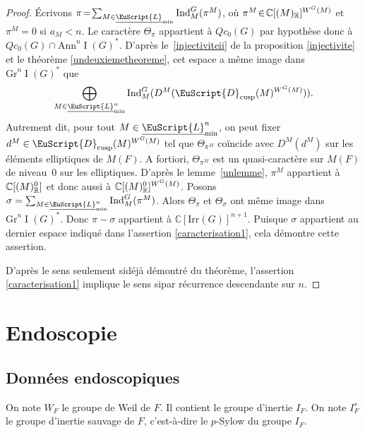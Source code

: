 \documentclass[JEP,XML,SOM,Unicode,francais]{cedram}
\let\mathcal \EuScript
\newcommand{\NoChangel}[1]{%
\expandafter\let\csname old\string#1\endcsname=#1
\let#1=\relax
\newcommand{#1}{\mathcode`l="716C\csname old\string#1\endcsname\mathcode`l="7160 }%
}
\newcommand{\Ann}{\mathrm{Ann}}
\newcommand{\cusp}{\mathrm{cusp}}
\newcommand{\Ell}{\mathrm{Ell}} \NoChangel{\Ell}
\newcommand{\Gr}{\mathrm{Gr}}
\newcommand{\Ind}{\mathrm{Ind}}
\newcommand{\Irr}{\mathrm{Irr}}
\DeclareMathOperator{\rI}{I}
\newcommand{\cD}{\mathcal{D}}
\newcommand{\cL}{\mathcal{L}}
\newcommand{\CC}{\mathbb{C}}
\newcommand{\RR}{\mathbb{R}}
\theoremstyle{plain}
\theoremstyle{definition}
\begin{document}
\begin{proof}
Écrivons $\pi\!=\!\sum_{M\in \underline{\cL}_{\min}}\Ind_{M}^G(\pi^M)$, où $\pi^M\!\in\!\CC[\Ell(M)_{\RR}]^{W^G(M)}$ et $\pi^M\!=\!0$ si $a_{M}\!<\!n$. Le caractère $\Theta_{\pi}$ appartient à $Qc_{0}(G)$ par hypothèse donc à $Qc_{0}(G)\cap \Ann^n\rI(G)^*$. D'après le~\eqref{injectiviteii} de la proposition \ref{injectivite} et le théorème \ref{undeuxiemetheoreme}, cet espace a même image dans $\Gr^n\rI(G)^*$ que
\[
\bigoplus_{M\in \underline{\cL}^n_{\min}}\Ind_{M}^G(D^M(\cD_{\cusp}(M)^{W^G(M)})).
\]
Autrement dit, pour tout $M\in \underline{\cL}^n_{\min}$, on peut fixer $d^M\in \cD_{\cusp}(M)^{W^G(M)}$ tel que $\Theta_{\pi^M}$ coïncide avec $D^M(d^M)$ sur les éléments elliptiques de $M(F)$. A fortiori, $\Theta_{\pi^M}$ est un quasi-caractère sur $M(F)$ de niveau~$0$ sur les elliptiques. D'après le lemme~\ref{unlemme}, $\pi^M$ appartient à $\CC[\Ell(M)_{\RR}^0]$ et donc aussi à $\CC[\Ell(M)_{\RR}^0]^{W^G(M)}$. Posons
$\sigma=\sum_{M\in \underline{\cL}^n_{\min}}\Ind_{M}^G(\pi^M)$. Alors $\Theta_{\pi}$ et $\Theta_{\sigma}$ ont même image dans $\Gr^n\rI(G)^*$. Donc $\pi-\sigma$ appartient à $\CC[\Irr(G)]^{n+1}$. Puisque $\sigma$ appartient au dernier espace indiqué dans l'assertion \eqref{caracterisation1}, cela démontre cette assertion.

D'après le sens \og seulement si\fg déjà démontré du théorème, l'assertion \eqref{caracterisation1} implique le sens \og si\fg par récurrence descendante sur $n$.
\end{proof}

\section{Endoscopie}

\subsection{Données endoscopiques}\label{donneesendoscopiques}
On note $W_{F}$ le groupe de Weil de $F$. Il contient le groupe d'inertie $I_{F}$. On note $I_{F}^s$ le groupe d'inertie sauvage de $F$, c'est-à-dire le $p$-Sylow du groupe $I_{F}$.
\end{document}
